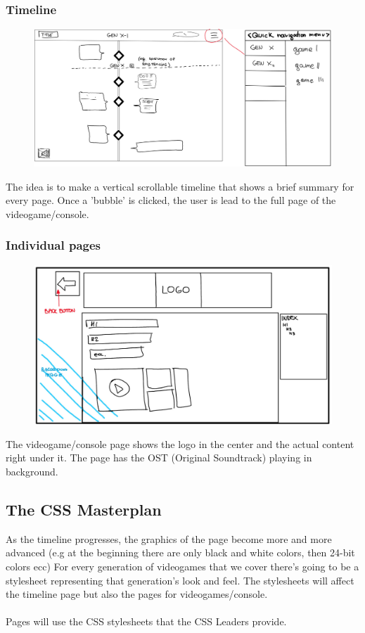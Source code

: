 \documentclass[a4paper,10pt]{article}
\begin{document}
    \subsubsection{Timeline}
        \begin{figure}[h]
        \includegraphics[width=.7\linewidth]{media/timeline_sketch.jpg}
        \end{figure}
        The idea is to make a vertical scrollable timeline that shows a brief summary for every page. Once a 'bubble' is clicked, the user is lead to the full page of the videogame/console.
    \subsubsection{Individual pages}
        \begin{figure}[h!]
        \includegraphics[width=.5\linewidth]{media/page_sketch.jpg}
        \end{figure}
        The videogame/console page shows the logo in the center and the actual content right under it. The page has the OST (Original Soundtrack) playing in background.
    \newpage
    \subsection{The CSS Masterplan}
        As the timeline progresses, the graphics of the page become more and more advanced (e.g at the beginning there are only black and white colors, then 24-bit colors ecc)
        For every generation of videogames that we cover there's going to be a stylesheet representing that generation's look and feel. The stylesheets will affect the timeline page but also the pages for videogames/console.\\\\
        Pages will use the CSS stylesheets that the CSS Leaders provide.
\end{document}
